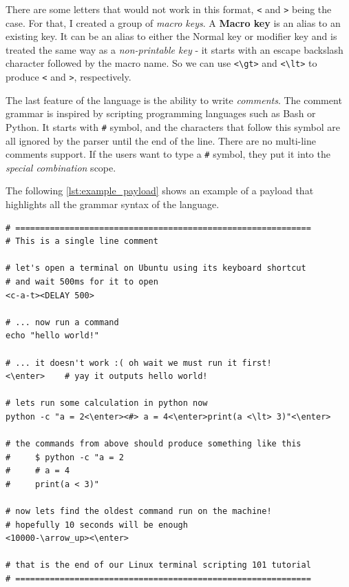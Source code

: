 There are some letters that would not work in this format, \verb|<| and \verb|>| being the case. For that, I created a group of \emph{macro keys}. A \textbf{Macro key} is an alias to an existing key. It can be an alias to either the Normal key or modifier key and is treated the same way as a \emph{non-printable key} \-- it starts with an escape backslash character followed by the macro name. So we can use \verb|<\gt>| and \verb|<\lt>| to produce \verb|<| and \verb|>|, respectively.

The last feature of the language is the ability to write \emph{comments}. The comment grammar is inspired by scripting programming languages such as Bash or Python. It starts with \verb|#| symbol, and the characters that follow this symbol are all ignored by the parser until the end of the line. There are no multi-line comments support. If the users want to type a \verb|#| symbol, they put it into the \emph{special combination} scope.

The following \autoref{lst:example_payload} shows an example of a payload that highlights all the grammar syntax of the language.
\begin{lstlisting}[caption={Example payload in custom language.},
                   label={lst:example_payload}]
# ============================================================
# This is a single line comment

# let's open a terminal on Ubuntu using its keyboard shortcut
# and wait 500ms for it to open
<c-a-t><DELAY 500>

# ... now run a command
echo "hello world!"

# ... it doesn't work :( oh wait we must run it first!
<\enter>    # yay it outputs hello world!

# lets run some calculation in python now
python -c "a = 2<\enter><#> a = 4<\enter>print(a <\lt> 3)"<\enter>

# the commands from above should produce something like this
#     $ python -c "a = 2
#     # a = 4
#     print(a < 3)"

# now lets find the oldest command run on the machine!
# hopefully 10 seconds will be enough
<10000-\arrow_up><\enter>

# that is the end of our Linux terminal scripting 101 tutorial
# ============================================================
\end{lstlisting}


